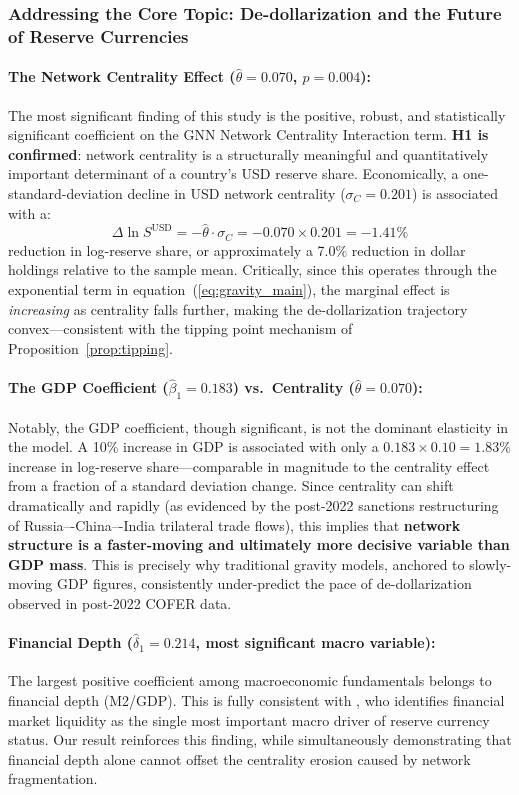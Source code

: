 \documentclass[12pt, letterpaper]{article}
\theoremstyle{definition}
\begin{document}
\subsubsection{Addressing the Core Topic: De-dollarization and the Future of Reserve Currencies}

\paragraph{The Network Centrality Effect ($\hat\theta = 0.070$, $p = 0.004$):}
The most significant finding of this study is the positive, robust, and statistically significant coefficient on the GNN Network Centrality Interaction term. \textbf{H1 is confirmed}: network centrality is a structurally meaningful and quantitatively important determinant of a country's USD reserve share. Economically, a one-standard-deviation decline in USD network centrality ($\sigma_C = 0.201$) is associated with a:
\[
\Delta \ln S^{\text{USD}} = -\hat\theta \cdot \sigma_C = -0.070 \times 0.201 = -1.41\%
\]
reduction in log-reserve share, or approximately a 7.0\% reduction in dollar holdings relative to the sample mean. Critically, since this operates through the exponential term in equation~(\ref{eq:gravity_main}), the marginal effect is \textit{increasing} as centrality falls further, making the de-dollarization trajectory convex---consistent with the tipping point mechanism of Proposition~\ref{prop:tipping}.

\paragraph{The GDP Coefficient ($\hat\beta_1 = 0.183$) vs.\ Centrality ($\hat\theta = 0.070$):}
Notably, the GDP coefficient, though significant, is not the dominant elasticity in the model. A 10\% increase in GDP is associated with only a $0.183 \times 0.10 = 1.83\%$ increase in log-reserve share---comparable in magnitude to the centrality effect from a fraction of a standard deviation change. Since centrality can shift dramatically and rapidly (as evidenced by the post-2022 sanctions restructuring of Russia–-China–-India trilateral trade flows), this implies that \textbf{network structure is a faster-moving and ultimately more decisive variable than GDP mass}. This is precisely why traditional gravity models, anchored to slowly-moving GDP figures, consistently under-predict the pace of de-dollarization observed in post-2022 COFER data.

\paragraph{Financial Depth ($\hat\delta_1 = 0.214$, most significant macro variable):}
The largest positive coefficient among macroeconomic fundamentals belongs to financial depth (M2/GDP). This is fully consistent with \citet{chinn2005euro}, who identifies financial market liquidity as the single most important macro driver of reserve currency status. Our result reinforces this finding, while simultaneously demonstrating that financial depth alone cannot offset the centrality erosion caused by network fragmentation.
\end{document}
